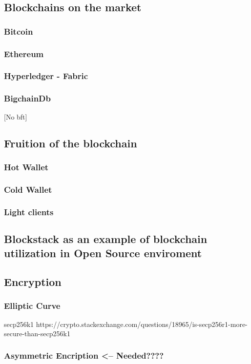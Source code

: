 \subsection{Blockchains on the market}

\subsubsection{Bitcoin}

\subsubsection{Ethereum}

\subsubsection{Hyperledger - Fabric}

\subsubsection{BigchainDb}
[No bft]



\subsection{Fruition of the blockchain}

\subsubsection{Hot Wallet}
\subsubsection{Cold Wallet}

\subsubsection{Light clients}

\subsection{Blockstack as an example of blockchain utilization in Open Source enviroment}

\subsection{Encryption}
\subsubsection{Elliptic Curve}
secp256k1
https://crypto.stackexchange.com/questions/18965/is-secp256r1-more-secure-than-secp256k1

\subsubsection{Asymmetric Encription <-- Needed????}



